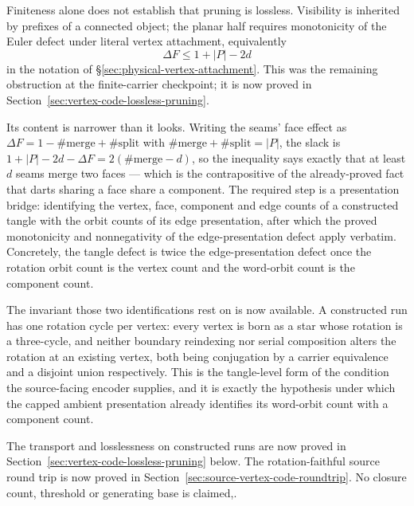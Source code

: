 Finiteness alone does not establish that pruning is lossless. Visibility
is inherited by prefixes of a connected object; the planar half requires
monotonicity of the Euler defect under literal vertex attachment, equivalently
\[
 \Delta F\le 1+|P|-2d
\]
in the notation of \S\ref{sec:physical-vertex-attachment}. This was the
remaining obstruction at the finite-carrier checkpoint; it is now proved
in Section~\ref{sec:vertex-code-lossless-pruning}.

Its content is narrower than it looks. Writing the seams' face effect as
$\Delta F=1-\#\mathrm{merge}+\#\mathrm{split}$ with
$\#\mathrm{merge}+\#\mathrm{split}=|P|$, the slack is
$1+|P|-2d-\Delta F=2(\#\mathrm{merge}-d)$, so the inequality says exactly
that at least $d$ seams merge two faces --- which is the contrapositive of
the already-proved fact that darts sharing a face share a component. The
required step is a presentation bridge: identifying the vertex, face,
component and edge counts of a
constructed tangle with the orbit counts of its edge presentation, after
which the proved monotonicity and nonnegativity of the edge-presentation
defect apply verbatim. Concretely, the tangle defect is twice the
edge-presentation defect once the rotation orbit count is the vertex count
and the word-orbit count is the component count.

The invariant those two identifications rest on is now available. A
constructed run has one rotation cycle per vertex: every vertex is born as a
star whose rotation is a three-cycle, and neither boundary reindexing nor
serial composition alters the rotation at an existing vertex, both being
conjugation by a carrier equivalence and a disjoint union respectively. This
is the tangle-level form of the condition the source-facing encoder supplies,
and it is exactly the hypothesis under which the capped ambient presentation
already identifies its word-orbit count with a component count.

The transport and losslessness on constructed runs are now proved in
Section~\ref{sec:vertex-code-lossless-pruning} below. The rotation-faithful
source round trip is now proved in Section~\ref{sec:source-vertex-code-roundtrip}.
No closure count, threshold
or generating base is claimed,.

